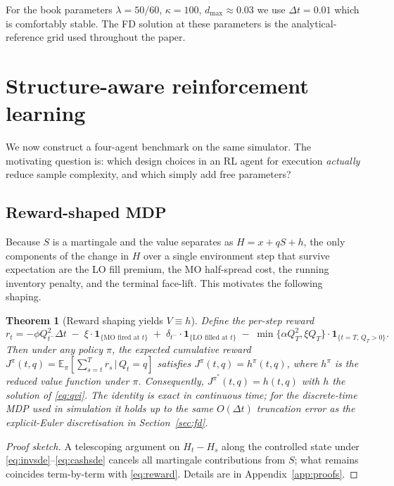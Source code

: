 \documentclass[]{interact}
\theoremstyle{plain}
\newtheorem{theorem}{Theorem}[section]
\theoremstyle{definition}
\theoremstyle{remark}
\newcommand{\E}{\mathbb{E}}
\newcommand{\1}[1]{\mathbf{1}_{\{#1\}}}
\begin{document}
For the book parameters $\lambda = 50/60$, $\kappa = 100$, $d_{\max} \approx 0.03$ we use $\Delta t = 0.01$ which is comfortably stable. The FD solution at these parameters is the analytical-reference grid used throughout the paper.

\section{Structure-aware reinforcement learning}\label{sec:rl}

We now construct a four-agent benchmark on the same simulator. The motivating question is: which design choices in an RL agent for execution \emph{actually} reduce sample complexity, and which simply add free parameters?

\subsection{Reward-shaped MDP}\label{sec:reward-shaping}
Because $S$ is a martingale and the value separates as $H = x + qS + h$, the only components of the change in $H$ over a single environment step that survive expectation are the LO fill premium, the MO half-spread cost, the running inventory penalty, and the terminal face-lift. This motivates the following shaping.

\begin{theorem}[Reward shaping yields $V \equiv h$]\label{thm:reward-shaping}
Define the per-step reward
\begin{equation}\label{eq:reward}
r_t = -\phi Q_{t^-}^2 \Delta t \;-\; \xi \cdot \1{\text{MO fired at }t}
\;+\; \delta_{t^-} \cdot \1{\text{LO filled at }t}
\;-\; \min\{\alpha Q_T^2,\xi Q_T\}\cdot \1{t=T,\,Q_T>0}.
\end{equation}
Then under any policy $\pi$, the expected cumulative reward
$
J^\pi(t,q) = \E_\pi\!\left[ \sum_{s=t}^{T} r_s\,\big|\, Q_t = q \right]
$
satisfies $J^\pi(t,q) = h^\pi(t,q)$, where $h^\pi$ is the reduced value function under $\pi$. Consequently, $J^{\pi^*}(t,q) = h(t,q)$ with $h$ the solution of \eqref{eq:qvi}. The identity is exact in continuous time; for the discrete-time MDP used in simulation it holds up to the same $O(\Delta t)$ truncation error as the explicit-Euler discretisation in Section~\ref{sec:fd}.
\end{theorem}
\begin{proof}[Proof sketch]
A telescoping argument on $H_t - H_s$ along the controlled state under \eqref{eq:invsde}--\eqref{eq:cashsde} cancels all martingale contributions from $S$; what remains coincides term-by-term with \eqref{eq:reward}. Details are in Appendix~\ref{app:proofs}.
\end{proof}
\end{document}
